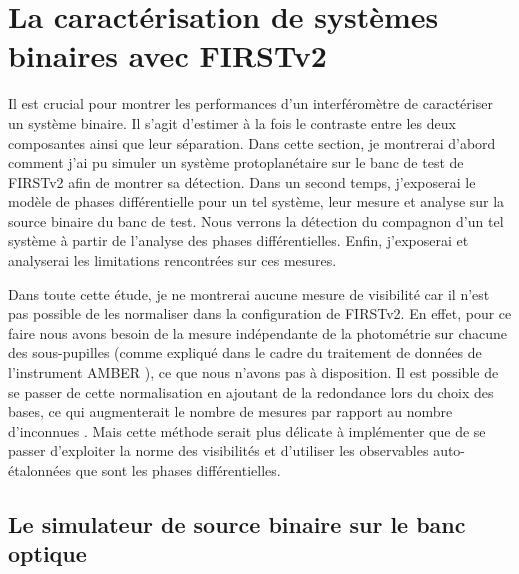 \newpage\thispagestyle{empty}
\chapter{La caractérisation de systèmes binaires avec FIRSTv2}
\label{sec:BinaryCharac}
\setcounter{figure}{0}
\setcounter{table}{0}

\begingroup
\hypersetup{linkcolor=black}
\minitoc
\endgroup

\clearpage
Il est crucial pour montrer les performances d'un interféromètre de caractériser un système binaire. Il s'agit d'estimer à la fois le contraste entre les deux composantes ainsi que leur séparation. Dans cette section, je montrerai d'abord comment j'ai pu simuler un système protoplanétaire sur le banc de test de \ac{FIRSTv2} afin de montrer sa détection. Dans un second temps, j'exposerai le modèle de phases différentielle pour un tel système, leur mesure et analyse sur la source binaire du banc de test. Nous verrons la détection du compagnon d'un tel système à partir de l'analyse des phases différentielles. Enfin, j'exposerai et analyserai les limitations rencontrées sur ces mesures.

Dans toute cette étude, je ne montrerai aucune mesure de visibilité car il n'est pas possible de les normaliser dans la configuration de \ac{FIRSTv2}. En effet, pour ce faire nous avons besoin de la mesure indépendante de la photométrie sur chacune des sous-pupilles (comme expliqué dans le cadre du traitement de données de l'instrument \ac{AMBER} \citep{tatulli2007}), ce que nous n'avons pas à disposition. Il est possible de se passer de cette normalisation en ajoutant de la redondance lors du choix des bases, ce qui augmenterait le nombre de mesures par rapport au nombre d'inconnues \citep{lacour2007}. Mais cette méthode serait plus délicate à implémenter que de se passer d'exploiter la norme des visibilités et d'utiliser les observables auto-étalonnées que sont les phases différentielles.



\section{Le simulateur de source binaire sur le banc optique}
\label{sec:SystBinaire}

